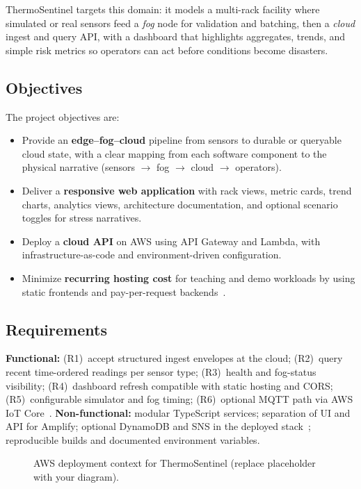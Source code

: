 \documentclass[conference]{IEEEtran}
\begin{document}
ThermoSentinel targets this domain: it models a multi-rack facility where simulated or real sensors feed a \emph{fog} node for validation and batching, then a \emph{cloud} ingest and query API, with a dashboard that highlights aggregates, trends, and simple risk metrics so operators can act before conditions become disasters.

\subsection{Objectives}
The project objectives are:
\begin{itemize}
  \item Provide an \textbf{edge--fog--cloud} pipeline from sensors to durable or queryable cloud state, with a clear mapping from each software component to the physical narrative (sensors $\rightarrow$ fog $\rightarrow$ cloud $\rightarrow$ operators).
  \item Deliver a \textbf{responsive web application} with rack views, metric cards, trend charts, analytics views, architecture documentation, and optional scenario toggles for stress narratives.
  \item Deploy a \textbf{cloud API} on AWS using API Gateway and Lambda, with infrastructure-as-code and environment-driven configuration.
  \item Minimize \textbf{recurring hosting cost} for teaching and demo workloads by using static frontends and pay-per-request backends~\cite{baldini2017serverless}.
\end{itemize}

\subsection{Requirements}
\textbf{Functional:} (R1)~accept structured ingest envelopes at the cloud; (R2)~query recent time-ordered readings per sensor type; (R3)~health and fog-status visibility; (R4)~dashboard refresh compatible with static hosting and CORS; (R5)~configurable simulator and fog timing; (R6)~optional MQTT path via AWS IoT Core~\cite{aws2024iot}. \textbf{Non-functional:} modular TypeScript services; separation of UI and API for Amplify; optional DynamoDB and SNS in the deployed stack~\cite{amazon2024lambda}; reproducible builds and documented environment variables.

\begin{figure}[!t]
\centering
{}
\caption{AWS deployment context for ThermoSentinel (replace placeholder with your diagram).}
\label{fig:aws}
\end{figure}
\end{document}
